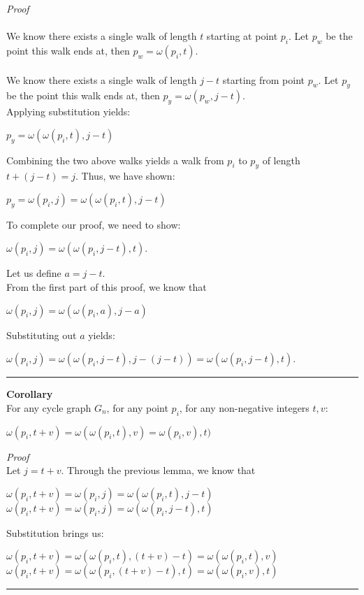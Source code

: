 \documentclass[a4paper,12pt]{article}
\begin{document}
\noindent
\textit{Proof}\\
\\
We know there exists a single walk of length $t$ starting at point $p_i$.
Let $p_w$ be the point this walk ends at, then $p_w = \omega(p_i, t)$.\\
\\
We know there exists a single walk of length $j - t$ starting from point $p_w$.
Let $p_y$ be the point this walk ends at, then $p_y = \omega(p_w, j - t)$.\\
Applying substitution yields:
\begin{center}
$p_y = \omega(\omega(p_i, t), j - t)$
\end{center}
Combining the two above walks yields a walk from $p_i$ to $p_y$ of length\\
$t + (j - t) = j$. Thus, we have shown:
\begin{center}
$p_y = \omega(p_i, j) = \omega(\omega(p_i, t), j - t)$
\end{center}
To complete our proof, we need to show:
\begin{center}
$\omega(p_i, j) = \omega(\omega(p_i, j - t), t)$.
\end{center}
Let us define $a = j - t$.\\
From the first part of this proof, we know that
\begin{center}
$\omega(p_i, j) = \omega(\omega(p_i, a), j - a)$
\end{center}
Substituting out $a$ yields:
\begin{center}
$\omega(p_i, j) = \omega(\omega(p_i, j - t), j - (j - t)) = \omega(\omega(p_i, j - t), t)$.
\end{center}
\begin{center}
\noindent\rule{8cm}{0.4pt}
\end{center}

\begin{tcolorbox}
\textbf{Corollary}\\
For any cycle graph $G_n$, for any point $p_i$, for any non-negative integers $t, v$:
\begin{center}
$\omega(p_i, t + v) = \omega(\omega(p_i, t), v) = \omega(p_i, v), t)$
\end{center}
\end{tcolorbox}
\noindent
\textit{Proof}\\
Let $j = t + v$.
Through the previous lemma, we know that
\begin{center}
$\omega(p_i, t + v) = \omega(p_i, j) = \omega(\omega(p_i, t), j - t)$\\
$\omega(p_i, t + v) = \omega(p_i, j) = \omega(\omega(p_i, j - t), t)$
\end{center}
Substitution brings us:
\begin{center}
$\omega(p_i, t + v) = \omega(\omega(p_i, t), (t + v) - t) = \omega(\omega(p_i, t), v)$
$\omega(p_i, t + v) = \omega(\omega(p_i, (t + v) - t), t) = \omega(\omega(p_i, v), t)$
\end{center}
\begin{center}
\noindent\rule{8cm}{0.4pt}
\end{center}
\end{document}
